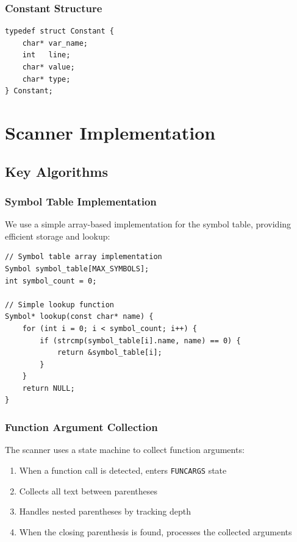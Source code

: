 \documentclass[12pt]{article}
\begin{document}
\subsubsection{Constant Structure}
\begin{verbatim}
typedef struct Constant {
    char* var_name; 
    int   line;
    char* value;
    char* type; 
} Constant;
\end{verbatim}

\section{Scanner Implementation}

\subsection{Key Algorithms}

\subsubsection{Symbol Table Implementation}
We use a simple array-based implementation for the symbol table, providing efficient storage and lookup:

\begin{verbatim}
// Symbol table array implementation
Symbol symbol_table[MAX_SYMBOLS];
int symbol_count = 0;

// Simple lookup function
Symbol* lookup(const char* name) {
    for (int i = 0; i < symbol_count; i++) {
        if (strcmp(symbol_table[i].name, name) == 0) {
            return &symbol_table[i];
        }
    }
    return NULL;
}
\end{verbatim}

\subsubsection{Function Argument Collection}
The scanner uses a state machine to collect function arguments:
\begin{enumerate}
    \item When a function call is detected, enters \texttt{FUNCARGS} state
    \item Collects all text between parentheses
    \item Handles nested parentheses by tracking depth
    \item When the closing parenthesis is found, processes the collected arguments
\end{enumerate}
\end{document}
